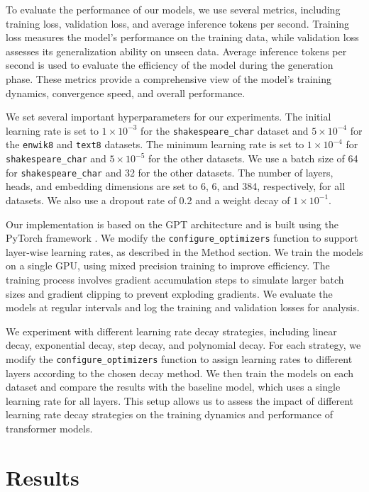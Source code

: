 \documentclass{article} %
\begin{document}
To evaluate the performance of our models, we use several metrics, including training loss, validation loss, and average inference tokens per second. Training loss measures the model's performance on the training data, while validation loss assesses its generalization ability on unseen data. Average inference tokens per second is used to evaluate the efficiency of the model during the generation phase. These metrics provide a comprehensive view of the model's training dynamics, convergence speed, and overall performance.

We set several important hyperparameters for our experiments. The initial learning rate is set to $1 \times 10^{-3}$ for the \texttt{shakespeare\_char} dataset and $5 \times 10^{-4}$ for the \texttt{enwik8} and \texttt{text8} datasets. The minimum learning rate is set to $1 \times 10^{-4}$ for \texttt{shakespeare\_char} and $5 \times 10^{-5}$ for the other datasets. We use a batch size of 64 for \texttt{shakespeare\_char} and 32 for the other datasets. The number of layers, heads, and embedding dimensions are set to 6, 6, and 384, respectively, for all datasets. We also use a dropout rate of 0.2 and a weight decay of $1 \times 10^{-1}$.

Our implementation is based on the GPT architecture \citep{radford2019language} and is built using the PyTorch framework \citep{paszke2019pytorch}. We modify the \texttt{configure\_optimizers} function to support layer-wise learning rates, as described in the Method section. We train the models on a single GPU, using mixed precision training to improve efficiency. The training process involves gradient accumulation steps to simulate larger batch sizes and gradient clipping to prevent exploding gradients. We evaluate the models at regular intervals and log the training and validation losses for analysis.

We experiment with different learning rate decay strategies, including linear decay, exponential decay, step decay, and polynomial decay. For each strategy, we modify the \texttt{configure\_optimizers} function to assign learning rates to different layers according to the chosen decay method. We then train the models on each dataset and compare the results with the baseline model, which uses a single learning rate for all layers. This setup allows us to assess the impact of different learning rate decay strategies on the training dynamics and performance of transformer models.

\section{Results}
\label{sec:results}
\end{document}
